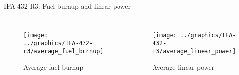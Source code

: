 \begin{frame}{IFA-432-R3: Fuel burnup and linear power}
  \footnotesize 
  
  \begin{columns}[t]


  \begin{figure}[h]
    \texttt{[image: ../graphics/IFA-432-r3/average\_fuel\_burnup]}
    \caption{Average fuel burnup}
  \end{figure}  


  \begin{figure}[h]
    \texttt{[image: ../graphics/IFA-432-r3/average\_linear\_power]}    
    \caption{Average linear power}
  \end{figure}  
  
  \end{columns}

\end{frame}
